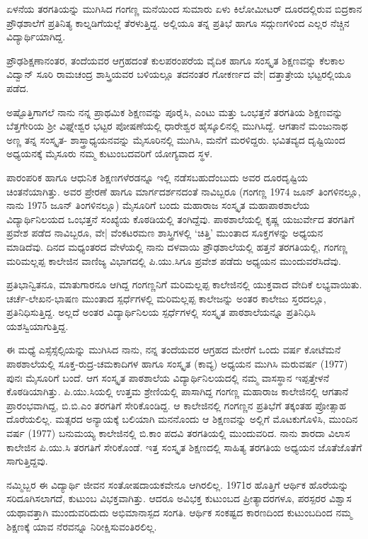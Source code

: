 ಏಳನೆಯ ತರಗತಿಯನ್ನು ಮುಗಿಸಿದ ಗಂಗಣ್ಣ ಮನೆಯಿಂದ ಸುಮಾರು ಏಳು ಕಿಲೋಮೀಟರ್ ದೂರದಲ್ಲಿರುವ ಬಿದ್ರಕಾನ ಪ್ರೌಢಶಾಲೆಗೆ ಪ್ರತಿನಿತ್ಯ ಕಾಲ್ನಡಿಗೆಯಲ್ಲೆ ತೆರಳುತ್ತಿದ್ದ. ಅಲ್ಲಿಯೂ ತನ್ನ ಪ್ರತಿಭೆ ಹಾಗೂ ಸದ್ಗುಣಗಳಿಂದ ಎಲ್ಲರ ನೆಚ್ಚಿನ ವಿದ್ಯಾರ್ಥಿಯಾಗಿದ್ದ.

ಪ್ರೌಢಶಿಕ್ಷಣಾನಂತರ, ತಂದೆಯವರ ಆಗ್ರಹದಂತೆ ಕುಲಪರಂಪರೆಯ ವೈದಿಕ ಹಾಗೂ ಸಂಸ್ಕೃತ ಶಿಕ್ಷಣವನ್ನು ಕೆಲಕಾಲ ವಿದ್ವಾನ್ ಸೂರಿ ರಾಮಚಂದ್ರ ಶಾಸ್ತ್ರಿಯವರ ಬಳಿಯಲ್ಲೂ ತದನಂತರ ಗೋಕರ್ಣದ ವೇ| ದತ್ತಾತ್ರೇಯ ಭಟ್ಟರಲ್ಲಿಯೂ ಪಡೆದ.

ಅಷ್ಟೊತ್ತಿಗಾಗಲೆ ನಾನು ನನ್ನ ಪ್ರಾಥಮಿಕ ಶಿಕ್ಷಣವನ್ನು ಪೂರೈಸಿ, ಎಂಟು ಮತ್ತು ಒಂಭತ್ತನೆ ತರಗತಿಯ ಶಿಕ್ಷಣವನ್ನು ಬೆತ್ತಗೇರಿಯ ಶ್ರೀ ವಿಘ್ನೇಶ್ವರ ಭಟ್ಟರ ಪೋಷಣೆಯಲ್ಲಿ ಧಾರೇಶ್ವರ ಹೈಸ್ಕೂಲಿನಲ್ಲಿ ಮುಗಿಸಿದ್ದೆ. ಆಗತಾನೆ ಮಂಜುನಾಥ ಅಣ್ಣ ತನ್ನ ಸಂಸ್ಕೃತ- ಶಾಸ್ತ್ರಾಧ್ಯಯನವನ್ನು ಮೈಸೂರಿನಲ್ಲಿ ಮುಗಿಸಿ, ಮನೆಗೆ ಮರಳಿದ್ದರು. ಭವಿತವ್ಯದ ದೃಷ್ಟಿಯಿಂದ ಅಧ್ಯಯನಕ್ಕೆ ಮೈಸೂರು ನಮ್ಮ ಕುಟುಂಬದವರಿಗೆ ಯೋಗ್ಯವಾದ ಸ್ಥಳ.

ಪಾರಂಪರಿಕ ಹಾಗೂ ಆಧುನಿಕ ಶಿಕ್ಷಣಗಳೆರಡನ್ನೂ ಇಲ್ಲಿ ನಡೆಸಬಹುದೆಂಬುದು ಅವರ ದೂರದೃಷ್ಟಿಯ ಚಿಂತನೆಯಾಗಿತ್ತು. ಅವರ ಪ್ರೇರಣೆ ಹಾಗೂ ಮಾರ್ಗದರ್ಶನದಂತೆ ನಾವಿಬ್ಬರೂ (ಗಂಗಣ್ಣ 1974 ಜೂನ್ ತಿಂಗಳಿನಲ್ಲೂ, ನಾನು 1975 ಜೂನ್ ತಿಂಗಳಿನಲ್ಲೂ) ಮೈಸೂರಿಗೆ ಬಂದು ಮಹಾರಾಜ ಸಂಸ್ಕೃತ ಮಹಾಪಾಠಶಾಲೆಯ ವಿದ್ಯಾರ್ಥಿನಿಲಯದ ಒಂಭತ್ತನೆ ಸಂಖ್ಯೆಯ ಕೊಠಡಿಯಲ್ಲಿ ತಂಗಿದ್ದೆವು. ಪಾಠಶಾಲೆಯಲ್ಲಿ ಕೃಷ್ಣ ಯಜುರ್ವೇದ ತರಗತಿಗೆ ಪ್ರವೇಶ ಪಡೆದ ನಾವಿಬ್ಬರೂ, ವೇ| ವೆಂಕಟರಮಣ ಶಾಸ್ತ್ರಿಗಳಲ್ಲಿ ‘ಚಿತ್ತಿ’ ಮುಂತಾದ ಸೂಕ್ತಗಳನ್ನು ಅಧ್ಯಯನ ಮಾಡಿದೆವು. ದಿನದ ಮಧ್ಯಂತರದ ವೇಳೆಯಲ್ಲಿ ನಾನು ದಳವಾಯಿ ಪ್ರೌಢಶಾಲೆಯಲ್ಲಿ ಹತ್ತನೆ ತರಗತಿಯಲ್ಲಿ, ಗಂಗಣ್ಣ ಮರಿಮಲ್ಲಪ್ಪ ಕಾಲೇಜಿನ ವಾಣಿಜ್ಯ ವಿಭಾಗದಲ್ಲಿ ಪಿ.ಯು.ಸಿಗೂ ಪ್ರವೇಶ ಪಡೆದು ಅಧ್ಯಯನ ಮುಂದುವರೆಸಿದೆವು.

ಪ್ರತಿಭಾನ್ವಿತನೂ, ಮಾತುಗಾರನೂ ಆಗಿದ್ದ ಗಂಗಣ್ಣನಿಗೆ ಮರಿಮಲ್ಲಪ್ಪ ಕಾಲೇಜಿನಲ್ಲಿ ಯುಕ್ತವಾದ ವೇದಿಕೆ ಲಭ್ಯವಾಯಿತು. ಚರ್ಚೆ-ಲೇಖನ-ಭಾಷಣ ಮುಂತಾದ ಸ್ಪರ್ಧೆಗಳಲ್ಲಿ ಮರಿಮಲ್ಲಪ್ಪ ಕಾಲೇಜನ್ನು ಅಂತರ ಕಾಲೇಜು ಸ್ತರದಲ್ಲೂ, ಪ್ರತಿನಿಧಿಸುತ್ತಿದ್ದ. ಅಲ್ಲದೆ ಅಂತರ ವಿದ್ಯಾರ್ಥಿನಿಲಯ ಸ್ಪರ್ಧೆಗಳಲ್ಲಿ ಸಂಸ್ಕೃತ ಪಾಠಶಾಲೆಯನ್ನೂ ಪ್ರತಿನಿಧಿಸಿ ಯಶಸ್ವಿಯಾಗುತ್ತಿದ್ದ. 

ಈ ಮಧ್ಯೆ ಎಸ್ಸೆಸ್ಸೆಲ್ಸಿಯನ್ನು ಮುಗಿಸಿದ ನಾನು, ನನ್ನ ತಂದೆಯವರ ಆಗ್ರಹದ ಮೇರೆಗೆ ಒಂದು ವರ್ಷ ಕೋಟೆಮನೆ ಪಾಠಶಾಲೆಯಲ್ಲಿ ಸೂಕ್ತ-ರುದ್ರ-ಚಮಕಾದಿಗಳ ಹಾಗೂ ಸಂಸ್ಕೃತ (ಕಾವ್ಯ) ಅಧ್ಯಯನ ಮುಗಿಸಿ ಮರುವರ್ಷ (1977) ಪುನಃ ಮೈಸೂರಿಗೆ ಬಂದೆ. ಆಗ ಸಂಸ್ಕೃತ ಪಾಠಶಾಲೆಯ ವಿದ್ಯಾರ್ಥಿನಿಲಯದಲ್ಲಿ ನಮ್ಮ ವಾಸಸ್ಥಾನ ಇಪ್ಪತ್ತೇಳನೆ ಕೊಠಡಿಯಾಗಿತ್ತು. ಪಿ.ಯು.ಸಿಯಲ್ಲಿ ಉತ್ತಮ ಶ್ರೇಣಿಯಲ್ಲಿ ಪಾಸಾಗಿದ್ದ ಗಂಗಣ್ಣ ಮಹಾರಾಜ ಕಾಲೇಜಿನಲ್ಲಿ ಆಗತಾನೆ ಪ್ರಾರಂಭವಾಗಿದ್ದ, ಬಿ.ಬಿ.ಎಂ ತರಗತಿಗೆ ಸೇರಿಕೊಂಡಿದ್ದ. ಆ ಕಾಲೇಜಿನಲ್ಲಿ ಗಂಗಣ್ಣನ ಪ್ರತಿಭೆಗೆ ತಕ್ಕಂತಹ ಪ್ರೋತ್ಸಾಹ ದೊರೆಯಲಿಲ್ಲ. ಮತ್ಸರದ ಅನ್ಯಾಯಕ್ಕೆ ಬಲಿಯಾಗಿ ಮನನೊಂದು ಆ ಶಿಕ್ಷಣವನ್ನು ಅಲ್ಲಿಗೆ ಮೊಟಕುಗೊಳಿಸಿ, ಮುಂದಿನ ವರ್ಷ (1977) ಬನುಮಯ್ಯ ಕಾಲೇಜಿನಲ್ಲಿ ಬಿ.ಕಾಂ ಪದವಿ ತರಗತಿಯಲ್ಲಿ ಮುಂದುವರಿದ. ನಾನು ಶಾರದಾ ವಿಲಾಸ ಕಾಲೇಜಿನ ಪಿ.ಯು.ಸಿ ತರಗತಿಗೆ ಸೇರಿಕೊಂಡೆ. ಇತ್ತ ಸಂಸ್ಕೃತ ಶಿಕ್ಷಣದಲ್ಲಿ ಸಾಹಿತ್ಯ ತರಗತಿಯ ಅಧ್ಯಯನ ಜೊತೆಜೊತೆಗೆ ಸಾಗುತ್ತಿದ್ದವು. 

ನಮ್ಮಿಬ್ಬರ ಈ ವಿದ್ಯಾರ್ಥಿ ಜೀವನ ಸಂತೋಷದಾಯಕವೇನೂ ಆಗಿರಲಿಲ್ಲ. 1971ರ ಹೊತ್ತಿಗೆ ಆರ್ಥಿಕ ಹೊರೆಯನ್ನು ಸರಿದೂಗಿಸಲಾಗದೆ, ಕುಟುಂಬ	ವಿಭಕ್ತವಾಗಿತ್ತು. ಆದರೂ ಅವಿಭಕ್ತ ಕುಟುಂಬದ ಪ್ರೀತ್ಯಾದರಗಳೂ, ಪರಸ್ಪರರ ವಿಶ್ವಾಸ ಯಥಾವತ್ತಾಗಿ ಮುಂದುವರಿದುದು ಅಭಿಮಾನಾಸ್ಪದ ಸಂಗತಿ. ಆರ್ಥಿಕ ಸಂಕಷ್ಟದ ಕಾರಣದಿಂದ ಕುಟುಂಬದಿಂದ ನಮ್ಮ ಶಿಕ್ಷಣಕ್ಕೆ ಯಾವ ನೆರವನ್ನೂ ನಿರೀಕ್ಷಿಸುವಂತಿರಲಿಲ್ಲ.

